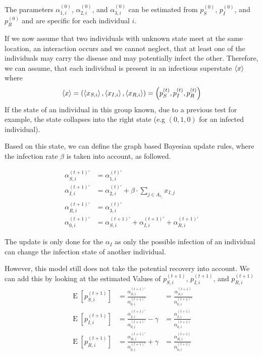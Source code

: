 The parameters $\alpha_{1,i}^{(0)}$, $\alpha_{2,i}^{(0)}$, and $\alpha_{3,i}^{(0)}$ can be estimated from $p_S^{(0)}$, $p_I^{(0)}$, and $p_R^{(0)}$ and are specific for each individual $i$.

If we now assume that two individuals with unknown state meet at the same location, an interaction occurs and we cannot neglect, that at least one of the individuals may carry the disease and may potentially infect the other. Therefore, we can assume, that each individual is present in an infectious superstate $\braket{x}$ where
\begin{equation}
    \braket{x} = \left(\braket{x_{S,i}}, \braket{x_{I,i}}, \braket{x_{R,i}}\right) = \left(p_S^{(t)},p_I^{(t)},p_R^{(t)}\right)
\end{equation}
If the state of an individual in this group known, due to a previous test for example, the state collapses into the right state (e.g $(0,1,0)$ for an infected individual).

Based on this state, we can define the graph based Bayesian update rules, where the infection rate $\beta$ is taken into account, as followed.

\begin{align}
    \alpha_{S,i}^{(t+1)\prime} &= \alpha_{1,i}^{(t)\prime}\\
    \alpha_{I,i}^{(t+1)\prime} &= \alpha_{2,i}^{(t)\prime} + \beta \cdot
    \sum_{j\in A_{v_i}}  x_{I,j}\\
    \alpha_{R,i}^{(t+1)\prime} &= \alpha_{3,i}^{(t)\prime}\\
    \alpha_{0,i}^{(t+1)\prime} &= \alpha_{S,i}^{(t+1)\prime}+\alpha_{I,i}^{(t+1)\prime}+\alpha_{R,i}^{(t+1)\prime}
\end{align}

The update is only done for the $\alpha_I$ as only the possible infection of an individual can change the infection state of another individual.

However, this model still does not take the potential recovery into account. We can add this by looking at the estimated Values of $p_{S,i}^{(t+1)}$, $p_{I,i}^{(t+1)}$, and $p_{R,i}^{(t+1)}$ 
\begin{align*}
    \operatorname{E}[p_{S,i}^{(t+1)}] &= \frac{\alpha_{S,i}^{(t+1)\prime}}{\alpha_{0,i}^{(t+1)\prime}} &= \frac{\alpha_{S,i}^{(t+1)}}{\alpha_{0,i}^{(t+1)\prime}} \\
    \operatorname{E}[p_{I,i}^{(t+1)}]&= \frac{\alpha_{I,i}^{(t+1)\prime}}{\alpha_{0,i}^{(t+1)\prime}}-\gamma &=\frac{\alpha_{I,i}^{(t+1)}}{\alpha_{0,i}^{(t+1)}} \\
    \operatorname{E}[p_{R,i}^{(t+1)}]&= \frac{\alpha_{R,i}^{(t+1)\prime}}{\alpha_{0,i}^{(t+1)\prime}}+\gamma &= \frac{\alpha_{R,i}^{(t+1)}}{\alpha_{0,i}^{(t+1)}}
\end{align*}

